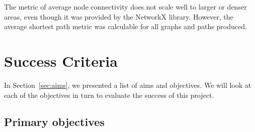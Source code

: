 \documentclass[12pt,a4paper]{report}
\begin{document}
The metric of average node connectivity does not scale well to larger or denser areas, even though it was provided by the NetworkX library. However, the average shortest path metric was calculable for all graphs and paths produced.

\section{Success Criteria}\label{sec:success}
In Section~\ref{sec:aims}, we presented a list of aims and objectives. We will look at each of the objectives in turn to evaluate the success of this project.

\subsection{Primary objectives}
\end{document}
